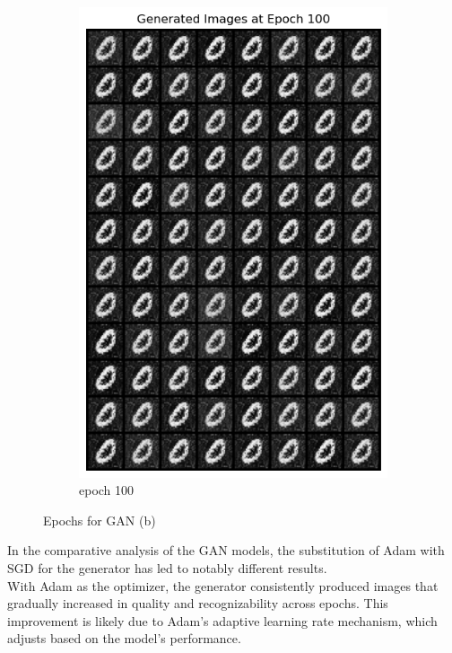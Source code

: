 \documentclass[a4paper]{article}
\theoremstyle{definition}
\newenvironment{soln}{
	\leavevmode\color{blue}\ignorespaces
}{}
\begin{document}
\begin{enumerate} [label=(\alph*)]
\begin{soln}
\begin{figure}[H]
\begin{subfigure}[b]{0.3\textwidth}
					\includegraphics[width=\textwidth]{2-Epoch100.png}
					\caption{epoch 100}
				\end{subfigure}
				\caption{Epochs for GAN (b)}
				\label{epochs_2}
			\end{figure}

		In the comparative analysis of the GAN models, the substitution of Adam with SGD for the generator has led to notably different results.\\
	
		With Adam as the optimizer, the generator consistently produced images that gradually increased in quality and recognizability across epochs. This improvement is likely due to Adam's adaptive learning rate mechanism, which adjusts based on the model's performance.\\
		

\end{soln}
\end{enumerate}
\end{document}
